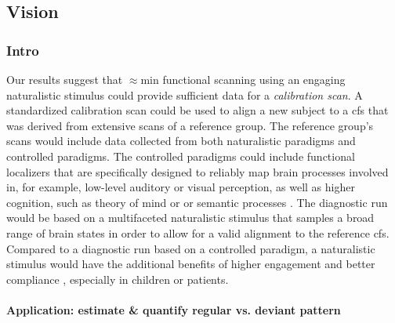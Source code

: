 \subsection{Vision}






\subsubsection{Intro}


%
Our results suggest that $\approx$\unit[15]{min} functional scanning using an
engaging naturalistic stimulus could provide sufficient data for a
\textit{calibration scan}.
%
A standardized calibration scan could be used to align a new subject to a
\ac{cfs} that was derived from extensive scans of a reference group.
%
The reference group's scans would include data collected from both naturalistic
paradigms and controlled paradigms.
%
The controlled paradigms could include functional localizers that are
specifically designed to reliably map brain processes involved in, for example,
low-level auditory or visual perception, as well as higher cognition, such as
theory of mind or \citep{spunt2014validating} or semantic processes
\citep{fedorenko2010new, fernandez2001language}.
%
The diagnostic run would be based on a multifaceted naturalistic stimulus that
samples a broad range of brain states in order to allow for a valid alignment to
the reference \ac{cfs}.
%
Compared to a diagnostic run based on a controlled paradigm, a naturalistic
stimulus would have the additional benefits of higher engagement and better
compliance \citep{vanderwal2015inscapes, eickhoff2020towards}, especially in
children or patients.


\paragraph{Application: estimate \& quantify regular vs. deviant pattern}

